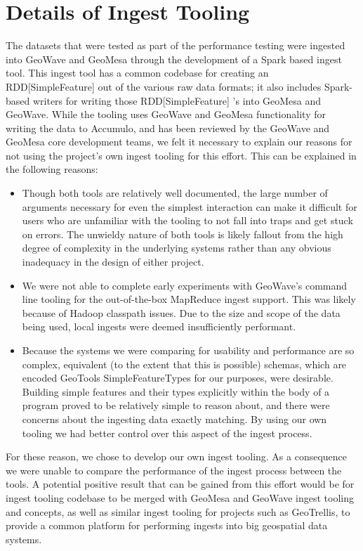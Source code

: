\section{Details of Ingest Tooling}
\label{appendix:ingest}

The datasets that were tested as part of the performance testing were ingested into GeoWave and GeoMesa through the development of a Spark based ingest tool.
This ingest tool has a common codebase for creating an RDD[SimpleFeature] out of the various raw data formats; it also includes Spark-based writers for writing those RDD[SimpleFeature] 's into GeoMesa and GeoWave.
While the tooling uses GeoWave and GeoMesa functionality for writing the data to Accumulo, and has been reviewed by the GeoWave and GeoMesa core development teams, we felt it necessary to explain our reasons for not using the project's own ingest tooling for this effort.
This can be explained in the following reasons:

\begin{itemize}
\item{
  Though both tools are relatively well documented, the large number of arguments necessary for even the simplest interaction can make it difficult for users who are unfamiliar with the tooling to not fall into traps and get stuck on errors.
  The unwieldy nature of both tools is likely fallout from the high degree of complexity in the underlying systems rather than any obvious inadequacy in the design of either project.
}
\item{
  We were not able to complete early experiments with GeoWave’s command line tooling for the out-of-the-box MapReduce ingest support.
  This was likely because of Hadoop classpath issues.
  Due to the size and scope of the data being used, local ingests were deemed insufficiently performant.
}
\item{
  Because the systems we were comparing for usability and performance are so complex, equivalent (to the extent that this is possible) schemas, which are encoded GeoTools SimpleFeatureTypes for our purposes, were desirable.
  Building simple features and their types explicitly within the body of a program proved to be relatively simple to reason about, and there were concerns about the ingesting data exactly matching.
  By using our own tooling we had better control over this aspect of the ingest process.
}
\end{itemize}

For these reason, we chose to develop our own ingest tooling.
As a consequence we were unable to compare the performance of the ingest process between the tools.
A potential positive result that can be gained from this effort would be for ingest tooling codebase to be merged with GeoMesa and GeoWave ingest tooling and concepts, as well as similar ingest tooling for projects such as GeoTrellis,
to provide a common platform for performing ingests into big geospatial data systems.
